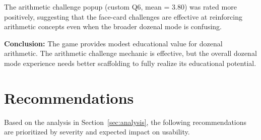 \documentclass[12pt, titlepage]{article}
\begin{document}
The arithmetic challenge popup (custom Q6, mean = 3.80) was rated more positively, suggesting that the face-card challenges are effective at reinforcing arithmetic concepts even when the broader dozenal mode is confusing.

\textbf{Conclusion:} The game provides modest educational value for dozenal arithmetic. The arithmetic challenge mechanic is effective, but the overall dozenal mode experience needs better scaffolding to fully realize its educational potential.


\section{Recommendations}\label{sec:recommendations}

Based on the analysis in Section~\ref{sec:analysis}, the following recommendations are prioritized by severity and expected impact on usability.
\end{document}
